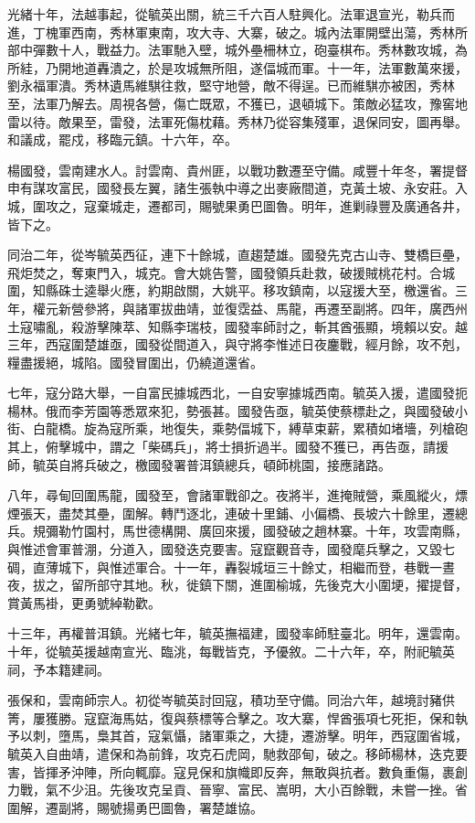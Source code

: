 \begin{pinyinscope}
光緒十年，法越事起，從毓英出關，統三千六百人駐興化。法軍退宣光，勒兵而進，丁槐軍西南，秀林軍東南，攻大寺、大寨，破之。城內法軍開壁出蕩，秀林所部中彈數十人，戰益力。法軍馳入壁，城外壘柵林立，砲臺棋布。秀林數攻城，為所絓，乃開地道轟潰之，於是攻城無所阻，遂偪城而軍。十一年，法軍數萬來援，劉永福軍潰。秀林遺馬維騏往救，堅守地營，敵不得逞。已而維騏亦被困，秀林至，法軍乃解去。周視各營，傷亡既眾，不獲已，退頓城下。策敵必猛攻，豫窖地雷以待。敵果至，雷發，法軍死傷枕藉。秀林乃從容集殘軍，退保同安，圖再舉。和議成，罷戍，移臨元鎮。十六年，卒。

楊國發，雲南建水人。討雲南、貴州匪，以戰功數遷至守備。咸豐十年冬，署提督申有謀攻富民，國發長左翼，諸生張執中導之出麥廠間道，克黃土坡、永安莊。入城，圍攻之，寇棄城走，遷都司，賜號果勇巴圖魯。明年，進剿祿豐及廣通各井，皆下之。

同治二年，從岑毓英西征，連下十餘城，直趨楚雄。國發先克古山寺、雙橋巨壘，飛炬焚之，奪東門入，城克。會大姚告警，國發領兵赴救，破援賊桃花村。合城圍，知縣硃士逵舉火應，約期啟關，大姚平。移攻鎮南，以寇援大至，檄還省。三年，權元新營參將，與諸軍拔曲靖，並復霑益、馬龍，再遷至副將。四年，廣西州土寇嘯亂，殺游擊陳萃、知縣李瑞枝，國發率師討之，斬其酋張顯，境賴以安。越三年，西寇圍楚雄亟，國發從間道入，與守將李惟述日夜鏖戰，經月餘，攻不剋，糧盡援絕，城陷。國發冒圍出，仍繞道還省。

七年，寇分路大舉，一自富民據城西北，一自安寧據城西南。毓英入援，遣國發扼楊林。俄而李芳園等悉眾來犯，勢張甚。國發告亟，毓英使蔡標赴之，與國發破小街、白龍橋。旋為寇所乘，地復失，乘勢偪城下，縛草束薪，累積如堵墻，列槍砲其上，俯擊城中，謂之「柴碼兵」，將士損折過半。國發不獲已，再告亟，請援師，毓英自將兵破之，檄國發署普洱鎮總兵，頓師桃園，接應諸路。

八年，尋甸回圍馬龍，國發至，會諸軍戰卻之。夜將半，進掩賊營，乘風縱火，熛煙張天，盡焚其壘，圍解。轉鬥逐北，連破十里鋪、小偏橋、長坡六十餘里，遷總兵。規彌勒竹園村，馬世德構開、廣回來援，國發破之趙林寨。十年，攻雲南縣，與惟述會軍普淜，分道入，國發迭克要害。寇竄觀音寺，國發麾兵擊之，又毀七碉，直薄城下，與惟述軍合。十一年，轟裂城垣三十餘丈，相繼而登，巷戰一晝夜，拔之，留所部守其地。秋，徙鎮下關，進圍榆城，先後克大小圍埂，擢提督，賞黃馬褂，更勇號綽勒歡。

十三年，再權普洱鎮。光緒七年，毓英撫福建，國發率師駐臺北。明年，還雲南。十年，從毓英援越南宣光、臨洮，每戰皆克，予優敘。二十六年，卒，附祀毓英祠，予本籍建祠。

張保和，雲南師宗人。初從岑毓英討回寇，積功至守備。同治六年，越境討豬供箐，屢獲勝。寇竄海馬姑，復與蔡標等合擊之。攻大寨，悍酋張項七死拒，保和執予以刺，墮馬，梟其首，寇氣懾，諸軍乘之，大捷，遷游擊。明年，西寇圍省城，毓英入自曲靖，遣保和為前鋒，攻克石虎岡，馳救邵甸，破之。移師楊林，迭克要害，皆揮矛沖陣，所向輒靡。寇見保和旗幟即反奔，無敢與抗者。數負重傷，裹創力戰，氣不少沮。先後攻克呈貢、晉寧、富民、嵩明，大小百餘戰，未嘗一挫。省圍解，遷副將，賜號揚勇巴圖魯，署楚雄協。


\end{pinyinscope}

